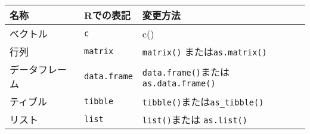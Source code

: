 \noindent {}
\begin{table}[htb]
 \begin{center}
  \begin{tabular}{lll} \toprule
名称 & Rでの表記 & 変更方法 \\ \midrule
ベクトル & \verb|c| & c() \\
行列 & \verb|matrix| & \index{matrix@\texttt{matrix()}}\verb|matrix()|
または\index{as.matrix@\texttt{as.matrix()}}\verb|as.matrix()| \\
データフレーム & \verb|data.frame| & \index{data.frame@\texttt{data.frame()}}\verb|data.frame()|または\index{as.data.frame@\texttt{as.data.frame()}}\verb|as.data.frame()| \\
ティブル & \verb|tibble| & \index{tibble@\texttt{tibble()}}\verb|tibble()|または\index{as_tibble@\texttt{as\_tibble()}}\verb|as_tibble()| \\
リスト & \verb|list| & \index{list@\texttt{list()}}\verb|list()|または
\index{as.list@\texttt{as.list()}}\verb|as.list()| \\ \bottomrule
  \end{tabular}
 \end{center}
\end{table}
